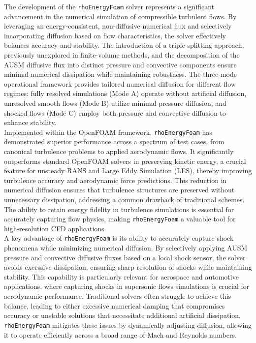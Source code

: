 \documentclass[a5paper]{sapthesis}
\begin{document}
	The development of the \texttt{rhoEnergyFoam} solver represents a significant advancement in the numerical simulation of compressible turbulent flows. By leveraging an energy-consistent, non-diffusive numerical flux and selectively incorporating diffusion based on flow characteristics, the solver effectively balances accuracy and stability. The introduction of a triple splitting approach, previously unexplored in finite-volume methods, and the decomposition of the AUSM diffusive flux into distinct pressure and convective components ensure minimal numerical dissipation while maintaining robustness. The three-mode operational framework provides tailored numerical diffusion for different flow regimes: fully resolved simulations (Mode A) operate without artificial diffusion, unresolved smooth flows (Mode B) utilize minimal pressure diffusion, and shocked flows (Mode C) employ both pressure and convective diffusion to enhance stability.
	\\
	Implemented within the OpenFOAM framework, \texttt{rhoEnergyFoam} has demonstrated superior performance across a spectrum of test cases, from canonical turbulence problems to applied aerodynamic flows. It significantly outperforms standard OpenFOAM solvers in preserving kinetic energy, a crucial feature for unsteady RANS and Large Eddy Simulation (LES), thereby improving turbulence accuracy and aerodynamic force predictions. This reduction in numerical diffusion ensures that turbulence structures are preserved without unnecessary dissipation, addressing a common drawback of traditional schemes. The ability to retain energy fidelity in turbulence simulations is essential for accurately capturing flow physics, making \texttt{rhoEnergyFoam} a valuable tool for high-resolution CFD applications.
	\\
	A key advantage of \texttt{rhoEnergyFoam} is its ability to accurately capture shock phenomena while minimizing numerical diffusion. By selectively applying AUSM pressure and convective diffusive fluxes based on a local shock sensor, the solver avoids excessive dissipation, ensuring sharp resolution of shocks while maintaining stability. This capability is particularly relevant for aerospace and automotive applications, where capturing shocks in supersonic flows simulations is crucial for aerodynamic performance. Traditional solvers often struggle to achieve this balance, leading to either excessive numerical damping that compromises accuracy or unstable solutions that necessitate additional artificial dissipation. \texttt{rhoEnergyFoam} mitigates these issues by dynamically adjusting diffusion, allowing it to operate efficiently across a broad range of Mach and Reynolds numbers.
\end{document}
